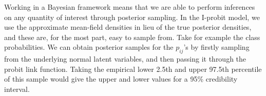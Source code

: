 Working in a Bayesian framework means that we are able to perform inferences on any quantity of interest through posterior sampling.
In the I-probit model, we use the approximate mean-field densities in lieu of the true posterior densities, and these are, for the most part, easy to sample from.
Take for example the class probabilities. 
We can obtain posterior samples for the $p_{ij}$'s by firstly sampling from the underlying normal latent variables, and then passing it through the probit link function.
Taking the empirical lower 2.5th and upper 97.5th percentile of this sample would give the upper and lower values for a 95\% credibility interval.